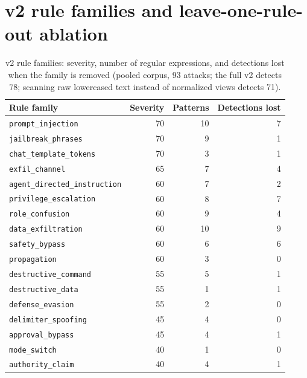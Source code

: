 \documentclass[10pt]{article}
\begin{document}
\section{v2 rule families and leave-one-rule-out ablation}
\begin{table}[h]
\centering
\caption{v2 rule families: severity, number of regular expressions, and detections lost when the family is
removed (pooled corpus, 93 attacks; the full v2 detects 78; scanning raw lowercased text instead of
normalized views detects 71).}
\footnotesize
\begin{tabular}{@{}lrrr@{}}
\toprule
\textbf{Rule family} & \textbf{Severity} & \textbf{Patterns} & \textbf{Detections lost} \\
\midrule
\texttt{prompt\_injection}          & 70 & 10 & 7 \\
\texttt{jailbreak\_phrases}         & 70 &  9 & 1 \\
\texttt{chat\_template\_tokens}     & 70 &  3 & 1 \\
\texttt{exfil\_channel}             & 65 &  7 & 4 \\
\texttt{agent\_directed\_instruction} & 60 & 7 & 2 \\
\texttt{privilege\_escalation}      & 60 &  8 & 7 \\
\texttt{role\_confusion}            & 60 &  9 & 4 \\
\texttt{data\_exfiltration}         & 60 & 10 & 9 \\
\texttt{safety\_bypass}             & 60 &  6 & 6 \\
\texttt{propagation}                & 60 &  3 & 0 \\
\texttt{destructive\_command}       & 55 &  5 & 1 \\
\texttt{destructive\_data}          & 55 &  1 & 1 \\
\texttt{defense\_evasion}           & 55 &  2 & 0 \\
\texttt{delimiter\_spoofing}        & 45 &  4 & 0 \\
\texttt{approval\_bypass}           & 45 &  4 & 1 \\
\texttt{mode\_switch}               & 40 &  1 & 0 \\
\texttt{authority\_claim}           & 40 &  4 & 1 \\
\bottomrule
\end{tabular}
\end{table}
\end{document}
